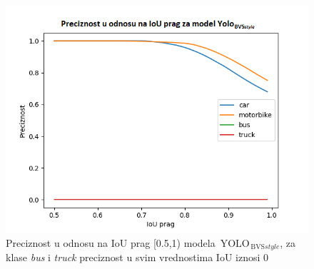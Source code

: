 \documentclass[12pt,oneside]{memoir}
\newcommand{\yolo}{\ensuremath{\,\textrm{YOLO}}}
\newcommand{\bvs}{\ensuremath{\,\textrm{BVS}}}
\begin{document}
\begin{figure}[!ht]
    \centering
    \includegraphics[width=1\textwidth]{matfmaster/glava4/precision_vs_iou_threshold_STYLaugment.png}
    \caption{Preciznost u odnosu na IoU prag [0.5,1) modela $\yolo_{\bvs{style}}$, za klase \textit{bus} i \textit{truck} preciznost u svim vrednostima IoU iznosi 0}
    \label{fig:section4_yolo4styleaug_prc}
\end{figure}
\end{document}
